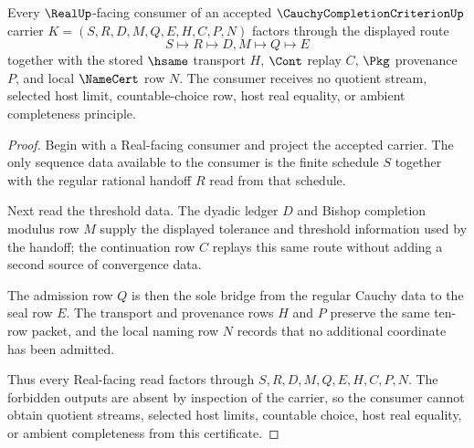 \begin{theorem}
\label{thm:cauchy-completion-criterion-real-seal-non-escape}
Every $\RealUp$-facing consumer of an accepted $\CauchyCompletionCriterionUp$ carrier $K=(S,R,D,M,Q,E,H,C,P,N)$ factors through the displayed route
$$
S \longmapsto R \longmapsto D,M \longmapsto Q \longmapsto E
$$
together with the stored $\hsame$ transport $H$, $\Cont$ replay $C$, $\Pkg$ provenance $P$, and local $\NameCert$ row $N$. The consumer receives no quotient stream, selected host limit, countable-choice row, host real equality, or ambient completeness principle.
\end{theorem}
\begin{proof}
Begin with a Real-facing consumer and project the accepted carrier. The only sequence data available to the consumer is the finite schedule $S$ together with the regular rational handoff $R$ read from that schedule.

Next read the threshold data. The dyadic ledger $D$ and Bishop completion modulus row $M$ supply the displayed tolerance and threshold information used by the handoff; the continuation row $C$ replays this same route without adding a second source of convergence data.

The admission row $Q$ is then the sole bridge from the regular Cauchy data to the seal row $E$. The transport and provenance rows $H$ and $P$ preserve the same ten-row packet, and the local naming row $N$ records that no additional coordinate has been admitted.

Thus every Real-facing read factors through $S,R,D,M,Q,E,H,C,P,N$. The forbidden outputs are absent by inspection of the carrier, so the consumer cannot obtain quotient streams, selected host limits, countable choice, host real equality, or ambient completeness from this certificate.
\end{proof}

